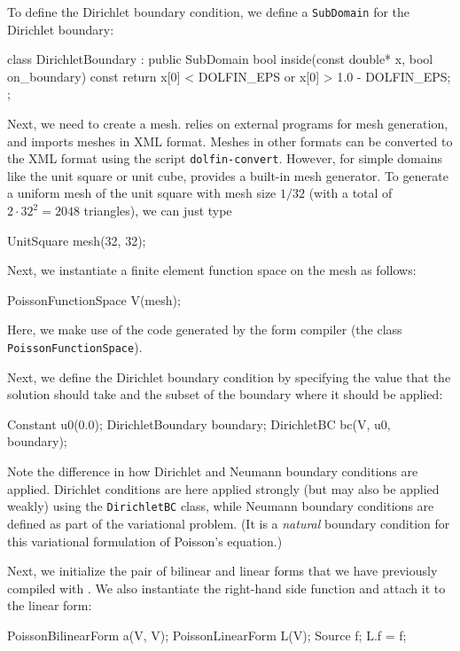 To define the Dirichlet boundary condition, we define a
\texttt{SubDomain} for the Dirichlet boundary:
\begin{code}
class DirichletBoundary : public SubDomain
{
  bool inside(const double* x, bool on_boundary) const
  {
    return x[0] < DOLFIN_EPS or x[0] > 1.0 - DOLFIN_EPS;
  }
};
\end{code}

Next, we need to create a mesh. \dolfin{} relies on external programs
for mesh generation, and imports meshes in \dolfin{} XML
format. Meshes in other formats can be converted to the \dolfin{} XML
format using the script \texttt{dolfin-convert}. However, for simple
domains like the unit square or unit cube, \dolfin{} provides a
built-in mesh generator. To generate a uniform mesh of the unit square
with mesh size $1/32$ (with a total of $2\cdot 32^2 = 2048$
triangles), we can just type
\begin{code}
UnitSquare mesh(32, 32);
\end{code}

Next, we instantiate a finite element function space on the mesh as follows:
\begin{code}
PoissonFunctionSpace V(mesh);
\end{code}
Here, we make use of the code generated by the form compiler (the
class \texttt{PoissonFunctionSpace}).

Next, we define the Dirichlet boundary condition by specifying the
value that the solution should take and the subset of the boundary
where it should be applied:
\begin{code}
Constant u0(0.0);
DirichletBoundary boundary;
DirichletBC bc(V, u0, boundary);
\end{code}
Note the difference in how Dirichlet and Neumann boundary conditions
are applied. Dirichlet conditions are here applied strongly (but may
also be applied weakly) using the \texttt{DirichletBC} class,
while Neumann boundary conditions are defined as part of the
variational problem. (It is a \emph{natural} boundary condition for
this variational formulation of Poisson's equation.)

Next, we initialize the pair of bilinear and linear forms that we have
previously compiled with \ffc{}. We also instantiate the right-hand
side function and attach it to the linear form:
\begin{code}
PoissonBilinearForm a(V, V);
PoissonLinearForm L(V);
Source f;
L.f = f;
\end{code}

